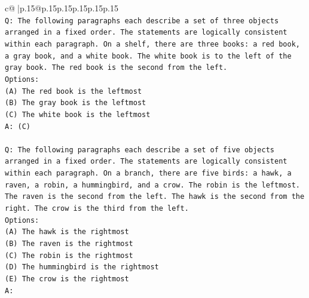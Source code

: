 \documentclass{article}
\begin{document}
{\begin{supertabular}{c@{$\;$}|p{.15\linewidth}@{}p{.15\linewidth}p{.15\linewidth}p{.15\linewidth}p{.15\linewidth}p{.15\linewidth}}
{{{\\ 
\texttt{Q: The following paragraphs each describe a set of three objects arranged in a fixed order. The statements are logically consistent within each paragraph. On a shelf, there are three books: a red book, a gray book, and a white book. The white book is to the left of the gray book. The red book is the second from the left.} \\
\texttt{Options:} \\
\texttt{(A) The red book is the leftmost} \\
\texttt{(B) The gray book is the leftmost} \\
\texttt{(C) The white book is the leftmost} \\
\texttt{A: (C)} \\
\\ 
\texttt{Q: The following paragraphs each describe a set of five objects arranged in a fixed order. The statements are logically consistent within each paragraph. On a branch, there are five birds: a hawk, a raven, a robin, a hummingbird, and a crow. The robin is the leftmost. The raven is the second from the left. The hawk is the second from the right. The crow is the third from the left.} \\
\texttt{Options:} \\
\texttt{(A) The hawk is the rightmost} \\
\texttt{(B) The raven is the rightmost} \\
\texttt{(C) The robin is the rightmost} \\
\texttt{(D) The hummingbird is the rightmost} \\
\texttt{(E) The crow is the rightmost} \\
\texttt{A:} \\
            }
        }
    }
     \\ \\


\end{supertabular}}
\end{document}
